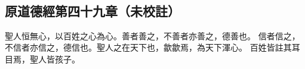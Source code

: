 ﻿%
%

\chapter{~}

\section{原道德經第四十九章（未校註）}

\begin{withgezhu}

\zhsong


聖人恒無心，以百姓之心為心。善者善之，不善者亦善之，德善也。
信者信之，不信者亦信之，德信也。聖人之在天下也，歙歙焉，為天下渾心。
百姓皆註其耳目焉，\textcolor{tongjia-color}{聖人皆孩子}。

\end{withgezhu}
